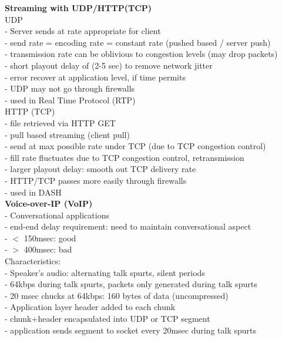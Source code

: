 \documentclass[10pt, a4paper]{article}
\newcommand{\blue}[1]{{\color{MidnightBlue}#1}}
\newcommand{\red}[1]{{\color{red}#1}}
\newcommand{\tab}[0]{\hspace*{2mm}}
\begin{document}
\begin{multicols*}{3}
		\textbf{Streaming with UDP/HTTP(TCP)}\\
		UDP\\
		- Server sends at rate appropriate for client\\
		\tab - send rate = encoding rate = constant rate (pushed based / server push)\\
		\tab - transmission rate can be \red{oblivious to congestion levels} (may drop packets)\\
		- short playout delay of (2-5 sec) to remove network jitter\\
		- error recover at \blue{application level}, if time permits\\
		- UDP may not go through firewalls\\
		- used in Real Time Protocol (RTP)\\

		HTTP (TCP)\\
		- file retrieved via HTTP GET\\
		\tab - pull based streaming (client pull)\\
		- send at \blue{max possible rate} under TCP (due to TCP congestion control)\\
		- fill rate fluctuates due to TCP congestion control, retransmission\\
		- larger playout delay: smooth out TCP delivery rate\\
		- HTTP/TCP passes more easily through firewalls\\
		- used in DASH\\

		\textbf{Voice-over-IP (VoIP)}\\
		- Conversational applications\\
		- \red{end-end delay requirement}: need to maintain conversational aspect\\
		\tab - $<$ 150msec: good\\
		\tab - $>$ 400msec: bad\\

		Characteristics:\\
		- Speaker's audio: alternating talk spurts, silent periods\\
		\tab - \blue{64kbps} during talk spurts, packets \red{only generated during talk spurts}\\
		\tab - 20 msec chucks at 64kbps: 160 bytes of data (uncompressed)\\
		- Application layer header added to each chunk\\
		- chunk+header encapsulated into UDP or TCP segment\\
		- application sends segment to socket every 20msec during talk spurts\\


\end{multicols*}
\end{document}
